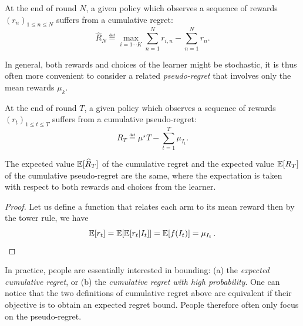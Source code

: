 \begin{definition}\label{def:mab.cumulative_regret}
\begin{leftbar}[defnbar]
	At the end of round $N$, a given policy which observes a sequence of rewards $(r_n)_{1 \leq n \leq N}$ suffers from a cumulative regret:
	\[
		\hat{R}_N \eqdef \max_{i=1\cdots K} \sum_{n=1}^N r_{i,n} - \sum_{n=1}^N r_n.
	\]
\end{leftbar}
\end{definition}

In general, both rewards and choices of the learner might be stochastic, it is thus often more convenient to consider a related \emph{pseudo-regret} that involves only the mean rewards $\mu_k$.

\begin{definition}\label{def:mab.pseudo_regret}
\begin{leftbar}[defnbar]
	At the end of round $T$, a given policy which observes a sequence of rewards $(r_t)_{1 \leq t \leq T}$ suffers from a cumulative pseudo-regret:
	\[
		R_T \eqdef \mu^{\star}T - \sum_{t=1}^T \mu_{I_t}.
	\]
\end{leftbar}
\end{definition}

\begin{proposition}\label{prop:mab.pseudo_regret}
\begin{leftbar}[propositionbar]
	The expected value $\mathbb{E}[\widehat{R}_T]$ of the cumulative regret and the expected value $\mathbb{E}[R_T]$ of the cumulative pseudo-regret are the same, where the expectation is taken with respect to both rewards and choices from the learner.
\end{leftbar}
\end{proposition}

\begin{proof}
	Let us define a function that relates each arm to its mean reward  then by the tower rule, we have
    \[
	    \mathbb{E}[r_t] = \mathbb{E}[\mathbb{E}[r_t|I_t]] = \mathbb{E}[f(I_t)] = \mu_{I_t}\,.
    \]
\end{proof}

In practice, people are essentially interested in bounding: (a) the \emph{expected cumulative regret}, or (b) the \emph{cumulative regret with high probability}. One can notice that the two definitions of cumulative regret above are equivalent if their objective is to obtain an expected regret bound. People therefore often only focus on the pseudo-regret.

